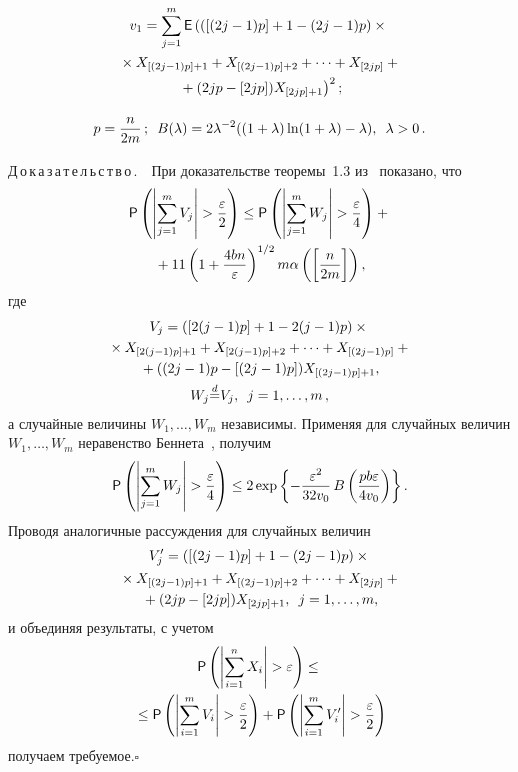\begin{multicols}{2}
\vspace*{-12pt}

\noindent
\begin{multline*}
v_1 = \sum\limits_{j=1}^m {\sf E}\left(([(2j-1)p]+1-(2j-1)p)\times{} \right.\\
{}\times X_{[(2j- 1)p]+1}+X_{[(2j-1)p]+2}+\cdots + X_{[2jp]} +{}\\
\left.{}+ (2jp-[2jp])X_{[2jp]+1}\right)^2;
\end{multline*}

\noindent
$$
p=\displaystyle\frac{\displaystyle n\mathstrut}{\displaystyle 2m\mathstrut}\,; \enskip B(\lambda) = 2\lambda^{-2}((1+\lambda)\ln(1+\lambda)-
\lambda), \enskip \lambda>0\,.
$$


\noindent
Д\,о\,к\,а\,з\,а\,т\,е\,л\,ь\,с\,т\,в\,о\,.\ \ При доказательстве теоремы~1.3 из~\cite{Bosq} 
показано, что
\begin{multline*}
{\sf P} \left(\left|\sum\limits_{j=1}^m V_j\right| > \displaystyle\frac{\displaystyle \varepsilon\mathstrut}{\displaystyle 2\mathstrut} \right) \leq 
{\sf P} \left(\left|\sum\limits_{j=1}^m W_j\right| > \displaystyle\frac{\displaystyle \varepsilon\mathstrut}{\displaystyle 4\mathstrut}\right) + {}\\
{}+
11\left(1+\displaystyle\frac{\displaystyle 4bn\mathstrut}{\displaystyle \varepsilon\mathstrut}\right)^{1/2} m 
\alpha\left(\left[\displaystyle\frac{\displaystyle n\mathstrut}{\displaystyle 2m\mathstrut}\right]\right),
\end{multline*}
где
\begin{multline*}
V_j = ([2(j-1)p]+1-2(j-1)p)\times{}\\
{}\times X_{[2(j-1)p]+1}+X_{[2(j-1)p]+2}+\cdots + X_{[(2j-1)p]} + {}\\
{}+((2j-1)p-[(2j-1)p])X_{[(2j-1)p]+1},\\
  W_j {\overset{d}{=}} V_j, \enskip j = 1,\ldots,m\,,
  \end{multline*}
а случайные величины $W_1,\ldots,W_m$ независимы. Применяя для случайных величин 
$W_1,\ldots,W_m$ неравенство Беннета~\cite{Pollard}, получим
$$
{\sf P} \left(\left|\sum\limits_{j=1}^m W_j\right| > \displaystyle\frac{\displaystyle \varepsilon\mathstrut}{\displaystyle 4\mathstrut}\right) \leq 2 
\exp\left\{-\displaystyle\frac{\displaystyle \varepsilon^2\mathstrut}{\displaystyle 32 v_0\mathstrut}\, 
B\left(\displaystyle\frac{\displaystyle pb\varepsilon\mathstrut}{\displaystyle 4v_0\mathstrut}\right)\right\}.
$$
Проводя аналогичные рассуждения для случайных величин
\begin{multline*}
V'_j = ([(2j-1)p]+1-(2j-1)p) \times{}\\
{}\times X_{[(2j-1)p]+1}+X_{[(2j-1)p]+2}+\cdots + X_{[2jp]} +{}\\
{}+ (2jp-[2jp])X_{[2jp]+1}, \enskip j = 1,\ldots,m,
\end{multline*}
и объединяя результаты, с учетом
\begin{multline*}
{\sf P} \left(\left|\sum\limits_{i=1}^n X_i \right| > \varepsilon \right) \leq {}\\
{}\leq 
{\sf P} \left(\left|\sum\limits_{i=1}^m V_i \right| > \displaystyle\frac{\displaystyle \varepsilon\mathstrut}{\displaystyle 2\mathstrut} \right) + 
{\sf P} \left(\left|\sum\limits_{i=1}^m V'_i \right| > \displaystyle\frac{\displaystyle \varepsilon\mathstrut}{\displaystyle 2\mathstrut} \right)
\end{multline*}
получаем требуемое.\hfill$\square$



\end{multicols}
